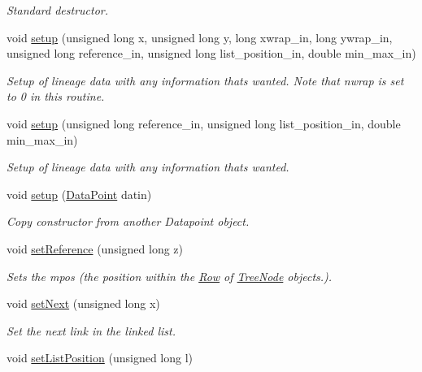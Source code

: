 \begin{DoxyCompactItemize}
\begin{DoxyCompactList}\small\item\em Standard destructor. \end{DoxyCompactList}\item 
void \hyperlink{class_data_point_a426e22fa33be467e3cddf71990d3ca8a}{setup} (unsigned long x, unsigned long y, long xwrap\+\_\+in, long ywrap\+\_\+in, unsigned long reference\+\_\+in, unsigned long list\+\_\+position\+\_\+in, double min\+\_\+max\+\_\+in)
\begin{DoxyCompactList}\small\item\em Setup of lineage data with any information that\textquotesingle{}s wanted. Note that nwrap is set to 0 in this routine. \end{DoxyCompactList}\item 
void \hyperlink{class_data_point_abddc939aebb23f387a23ca5f9ce0eda0}{setup} (unsigned long reference\+\_\+in, unsigned long list\+\_\+position\+\_\+in, double min\+\_\+max\+\_\+in)
\begin{DoxyCompactList}\small\item\em Setup of lineage data with any information that\textquotesingle{}s wanted. \end{DoxyCompactList}\item 
void \hyperlink{class_data_point_a1e8c41e56eb1d69a52f5246d9f7ee3f1}{setup} (\hyperlink{class_data_point}{Data\+Point} datin)
\begin{DoxyCompactList}\small\item\em Copy constructor from another Datapoint object. \end{DoxyCompactList}\item 
void \hyperlink{class_data_point_a2433657bfd215678d40904310b926033}{set\+Reference} (unsigned long z)
\begin{DoxyCompactList}\small\item\em Sets the mpos (the position within the \hyperlink{class_row}{Row} of \hyperlink{class_tree_node}{Tree\+Node} objects.). \end{DoxyCompactList}\item 
void \hyperlink{class_data_point_aa8279493a06f7c9f810e27673d38f5d4}{set\+Next} (unsigned long x)
\begin{DoxyCompactList}\small\item\em Set the next link in the linked list. \end{DoxyCompactList}\item 
void \hyperlink{class_data_point_a8cbeb60a0cb7e46a2bf37973dc72c3b2}{set\+List\+Position} (unsigned long l)

\end{DoxyCompactItemize}
